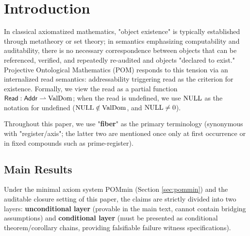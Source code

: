 \section{Introduction}

In classical axiomatized mathematics, "object existence" is typically established through metatheory or set theory; in semantics emphasizing computability and auditability, there is no necessary correspondence between objects that can be referenced, verified, and repeatedly re-audited and objects "declared to exist." Projective Ontological Mathematics (POM) responds to this tension via an internalized read semantics: addressability triggering read as the criterion for existence. Formally, we view the read as a partial function $\mathsf{Read}:\mathsf{Addr}\rightharpoonup \mathrm{ValDom}$; when the read is undefined, we use $\mathrm{NULL}$ as the notation for undefined ($\mathrm{NULL}\notin\mathrm{ValDom}$, and $\mathrm{NULL}\neq 0$).\par
Throughout this paper, we use "\textbf{fiber}" as the primary terminology (synonymous with "register/axis"; the latter two are mentioned once only at first occurrence or in fixed compounds such as prime-register).\par

\subsection{Main Results}
Under the minimal axiom system POMmin (Section \ref{sec:pommin}) and the auditable closure setting of this paper, the claims are strictly divided into two layers: \textbf{unconditional layer} (provable in the main text, cannot contain bridging assumptions) and \textbf{conditional layer} (must be presented as conditional theorem/corollary chains, providing falsifiable failure witness specifications).\par

